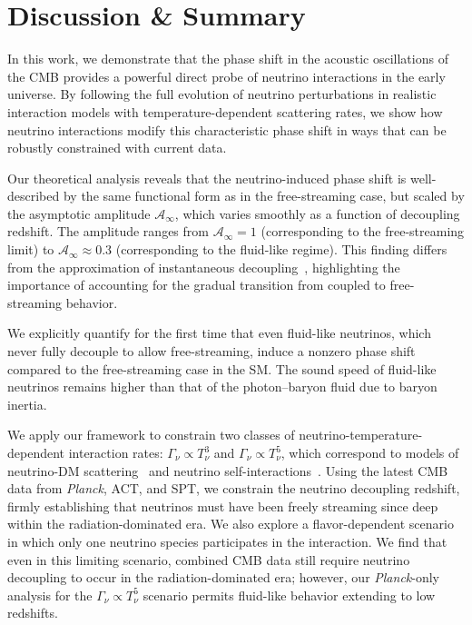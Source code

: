 \documentclass[aps,prd,twocolumn,showpacs,superscriptaddress,nofootinbib,preprintnumbers]{revtex4-2}
\begin{document}
\section{Discussion \& Summary}\label{sec:4}

\noindent In this work, we demonstrate that the phase shift in the acoustic oscillations of the CMB provides a powerful direct probe of neutrino interactions in the early universe. By following the full evolution of neutrino perturbations in realistic interaction models with temperature-dependent scattering rates, we show how neutrino interactions modify this characteristic phase shift in ways that can be robustly constrained with current data.

Our theoretical analysis reveals that the neutrino-induced phase shift is well-described by the same functional form as in the free-streaming case, but scaled by the asymptotic amplitude $\mathcal{A}_\infty$, which varies smoothly as a function of decoupling redshift. The amplitude ranges from $\mathcal{A}_\infty = 1$ (corresponding to the free-streaming limit) to $\mathcal{A}_\infty \approx 0.3$ (corresponding to the fluid-like regime). This finding differs from the approximation of instantaneous decoupling~\cite{Choi:2018gho,Loverde:2022wih}, highlighting the importance of accounting for the gradual transition from coupled to free-streaming behavior.

We explicitly quantify for the first time that even fluid-like neutrinos, which never fully decouple to allow free-streaming, induce a nonzero phase shift compared to the free-streaming case in the SM. The sound speed of fluid-like neutrinos remains higher than that of the photon–baryon fluid due to baryon inertia.

We apply our framework to constrain two classes of neutrino-temperature-dependent interaction rates: $\Gamma_\nu \propto T_\nu^3$ and $\Gamma_\nu \propto T_\nu^5$, which correspond to models of neutrino-DM scattering~\cite{Boehm:2003hm,Stadler:2019dii,Serra:2009uu,Olivares-DelCampo:2017feq,Ghosh:2017jdy,Ghosh:2024wva,Wilkinson:2014ksa,Escudero:2015yka,DiValentino:2017oaw,Ghosh:2019tab,Mosbech:2020ahp} and neutrino self-interactions~\cite{Cyr-Racine:2013jua,Oldengott:2014qra,Oldengott:2017fhy,Kreisch:2019yzn,Das:2020xke,Das:2023npl,RoyChoudhury:2020dmd,Lancaster:2017ksf,Camarena:2023cku,Poudou:2025qcx,He:2023oke,He:2025jwp}. Using the latest CMB data from \textit{Planck}, ACT, and SPT, we constrain the neutrino decoupling redshift, firmly establishing that neutrinos must have been freely streaming since deep within the radiation-dominated era. 
We also explore a flavor-dependent scenario in which only one neutrino species participates in the interaction. We find that even in this limiting scenario, combined CMB data still require neutrino decoupling to occur in the radiation-dominated era; however, our \textit{Planck}-only analysis for the $\Gamma_\nu \propto T_\nu^5$ scenario permits fluid-like behavior extending to low redshifts.
\end{document}
